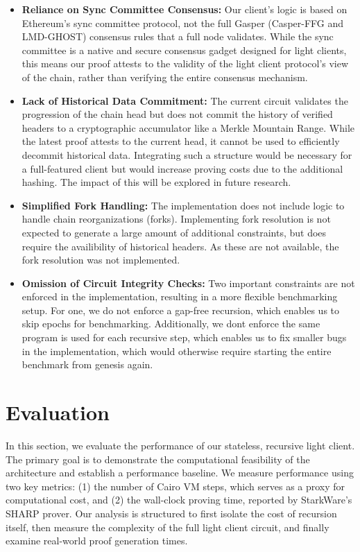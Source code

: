 \documentclass[runningheads]{llncs}
\begin{document}
\begin{itemize}
    \item \textbf{Reliance on Sync Committee Consensus:} Our client's logic is based on Ethereum's sync committee protocol, not the full Gasper (Casper-FFG and LMD-GHOST) consensus rules that a full node validates. While the sync committee is a native and secure consensus gadget designed for light clients, this means our proof attests to the validity of the light client protocol's view of the chain, rather than verifying the entire consensus mechanism.

    \item \textbf{Lack of Historical Data Commitment:} The current circuit validates the progression of the chain head but does not commit the history of verified headers to a cryptographic accumulator like a Merkle Mountain Range. While the latest proof attests to the current head, it cannot be used to efficiently decommit historical data. Integrating such a structure would be necessary for a full-featured client but would increase proving costs due to the additional hashing. The impact of this will be explored in future research.
    
    \item \textbf{Simplified Fork Handling:} The implementation does not include logic to handle chain reorganizations (forks). Implementing fork resolution is not expected to generate a large amount of additional constraints, but does require the availibility of historical headers. As these are not available, the fork resolution was not implemented.

    \item \textbf{Omission of Circuit Integrity Checks:} Two important constraints are not enforced in the implementation, resulting in a more flexible benchmarking setup. For one, we do not enforce a gap-free recursion, which enables us to skip epochs for benchmarking. Additionally, we dont enforce the same program is used for each recursive step, which enables us to fix smaller bugs in the implementation, which would otherwise require starting the entire benchmark from genesis again. 
\end{itemize}

\section{Evaluation}
\label{section:evaluation}

In this section, we evaluate the performance of our stateless, recursive light client. The primary goal is to demonstrate the computational feasibility of the architecture and establish a performance baseline. We measure performance using two key metrics: (1) the number of Cairo VM steps, which serves as a proxy for computational cost, and (2) the wall-clock proving time, reported by StarkWare's SHARP prover. Our analysis is structured to first isolate the cost of recursion itself, then measure the complexity of the full light client circuit, and finally examine real-world proof generation times.
\end{document}
